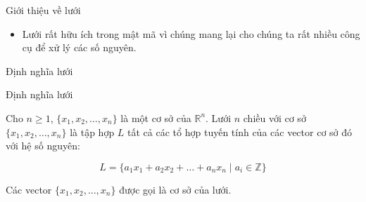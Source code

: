 \documentclass{beamer}
\numberwithin{equation}{section}
\begin{document}
\begin{frame}{Giới thiệu về lưới}
\begin{figure}[!h]
\end{figure}

\begin{itemize}
\item Lưới rất hữu ích trong mật mã vì chúng mang lại cho chúng ta rất nhiều công cụ để xử lý các số nguyên.
\end{itemize}

\end{frame}
\begin{frame}{Định nghĩa lưới}

\begin{block}{Định nghĩa lưới}

Cho \(n \geq 1 \), \(\{x_1, x_2, \ldots, x_n\}\) là một cơ sở của \(\mathbb{R}^n\).
Lưới \(n \) chiều với cơ sở \(\{x_1, x_2, \ldots, x_n\}\)
là tập hợp \(L \) tất cả các tổ hợp tuyến tính của các vector cơ sở đó với hệ số nguyên:

$$
L = \{a_1 x_1 + a_2 x_2 + \ldots + a_n x_n \mid a_i \in \mathbb{Z} \}
$$

Các vector \(\{x_1, x_2, \ldots, x_n\}\) được gọi là cơ sở của lưới.

\end{block}

\end{frame}
\end{document}
